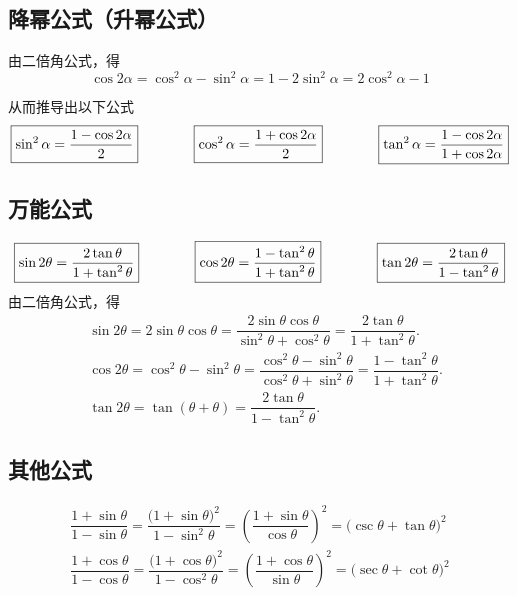 \subsection{降幂公式（升幂公式）}
由二倍角公式，得
\begin{equation*}
	\cos 2 \alpha = \cos^2 \alpha - \sin^2 \alpha = 1 - 2\sin^2 \alpha = 2 \cos^2 \alpha - 1
\end{equation*}

\noindent 从而推导出以下公式
\begin{equation}
	\boxed{\sin^2 \alpha = \dfrac{1 - \cos 2 \alpha }{2}} \qquad \qquad \boxed{\cos^2 \alpha = \dfrac{1 + \cos 2 \alpha }{2}} \qquad \qquad \boxed{\tan^2 \alpha = \dfrac{1 - \cos 2 \alpha }{1 + \cos 2 \alpha}}
	\vspace*{0.5em}
\end{equation}

\subsection{万能公式}
\begin{equation}
	\boxed{\sin 2 \theta = \dfrac{2 \tan \theta}{1 + \tan^2 \theta}} \qquad \qquad \boxed{\cos 2 \theta = \dfrac{1 - \tan^2 \theta}{1 + \tan^2 \theta}} \qquad \qquad \boxed{\tan 2 \theta = \dfrac{2 \tan \theta}{1 - \tan^2 \theta}}
	\vspace*{0.5em}
\end{equation}
\proof 由二倍角公式，得
\vspace*{-1em}
\begin{align*}
	& \sin 2 \theta = 2 \sin \theta \cos \theta = \dfrac{2 \sin \theta \cos \theta }{\sin^2 \theta + \cos^2 \theta} = \dfrac{2 \tan \theta}{1 + \tan^2 \theta}. \\[0.5em]
	&\cos 2 \theta = \cos^2 \theta - \sin^2 \theta = \dfrac{\cos^2 \theta - \sin^2 \theta}{\cos^2 \theta + \sin^2 \theta} = \dfrac{1 - \tan^2 \theta}{1 + \tan^2 \theta}.\\[0.5em]
	&\tan 2 \theta = \tan (\theta + \theta) = \dfrac{2 \tan\theta}{1 - \tan^2 \theta}.
\end{align*}


\subsection{其他公式}
\vspace*{-1em}
\begin{align}
	\dfrac{1 + \sin \theta}{1 - \sin \theta} = \dfrac{\big(1 + \sin \theta \big)^2}{1 - \sin^2 \theta} = \left( \dfrac{1 + \sin \theta}{\cos \theta} \right)^2 = \big(\csc \theta + \tan \theta \big)^2 \\[0.5em]
	\dfrac{1 + \cos \theta}{1 - \cos \theta} = \dfrac{\big( 1 + \cos \theta \big)^2}{1 - \cos^2 \theta} = \left( \dfrac{1 + \cos \theta}{\sin \theta} \right)^2 = \big( \sec \theta + \cot \theta \big)^2
\end{align}

